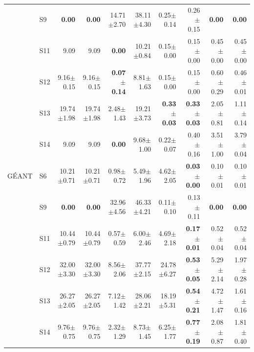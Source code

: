 \begin{table}[t]
\begin{tabular}{llrrrrrrrr}
 & S9 & \textbf{0.00} & \textbf{0.00} & 14.71$\pm$2.70 & 38.11$\pm$4.30 & 0.25$\pm$0.14 & 0.26$\pm$0.15 & \textbf{0.00} & \textbf{0.00}\\
 & S11 & 9.09 & 9.09 & \textbf{0.00} & 10.21$\pm$0.84 & 0.15$\pm$0.00 & 0.15$\pm$0.00 & 0.45$\pm$0.00 & 0.45$\pm$0.00\\
 & S12 & 9.16$\pm$0.15 & 9.16$\pm$0.15 & \textbf{0.07$\pm$0.14} & 8.81$\pm$1.63 & 0.15$\pm$0.00 & 0.15$\pm$0.00 & 0.60$\pm$0.29 & 0.46$\pm$0.01\\
 & S13 & 19.74$\pm$1.98 & 19.74$\pm$1.98 & 2.48$\pm$1.43 & 19.21$\pm$3.73 & \textbf{0.33$\pm$0.03} & \textbf{0.33$\pm$0.03} & 2.05$\pm$0.81 & 1.11$\pm$0.14\\
 & S14 & 9.09 & 9.09 & \textbf{0.00} & 9.68$\pm$1.00 & 0.22$\pm$0.07 & 0.40$\pm$0.16 & 3.51$\pm$1.00 & 3.79$\pm$0.04\\
\midrule
G\'EANT & S6 & 10.21$\pm$0.71 & 10.21$\pm$0.71 & 0.98$\pm$0.72 & 5.49$\pm$1.96 & 4.62$\pm$2.05 & \textbf{0.03$\pm$0.00} & 0.10$\pm$0.01 & 0.10$\pm$0.01\\
 & S9 & \textbf{0.00} & \textbf{0.00} & 32.96$\pm$4.56 & 46.33$\pm$4.21 & 0.11$\pm$0.10 & 0.13$\pm$0.11 & \textbf{0.00} & \textbf{0.00}\\
 & S11 & 10.44$\pm$0.79 & 10.44$\pm$0.79 & 0.57$\pm$0.59 & 6.00$\pm$2.46 & 4.69$\pm$2.18 & \textbf{0.17$\pm$0.01} & 0.52$\pm$0.04 & 0.52$\pm$0.04\\
 & S12 & 32.00$\pm$3.30 & 32.00$\pm$3.30 & 8.56$\pm$2.06 & 37.77$\pm$2.15 & 24.78$\pm$6.27 & \textbf{0.53$\pm$0.05} & 5.29$\pm$2.14 & 1.97$\pm$0.28\\
 & S13 & 26.27$\pm$2.05 & 26.27$\pm$2.05 & 7.12$\pm$1.42 & 28.06$\pm$2.21 & 18.19$\pm$5.31 & \textbf{0.54$\pm$0.21} & 4.72$\pm$1.47 & 1.61$\pm$0.16\\
 & S14 & 9.76$\pm$0.75 & 9.76$\pm$0.75 & 2.32$\pm$1.29 & 8.73$\pm$1.45 & 6.25$\pm$1.77 & \textbf{0.77$\pm$0.19} & 2.08$\pm$0.87 & 1.81$\pm$0.40\\
\bottomrule
\end{tabular}
\end{table}